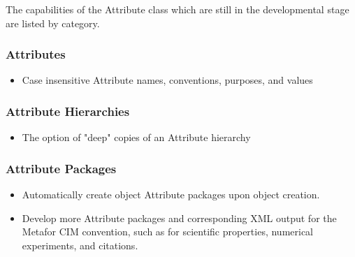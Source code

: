 %

The capabilities of the Attribute class which are still in the developmental stage are listed by category.
 
\subsubsection{Attributes}

\begin{itemize}
\item Case insensitive Attribute names, conventions, purposes, and values
\end{itemize}

\subsubsection{Attribute Hierarchies}

\begin{itemize}
\item The option of "deep" copies of an Attribute hierarchy
\end{itemize}

\subsubsection{Attribute Packages}

\begin{itemize}
\item Automatically create object Attribute packages upon object creation.
\item Develop more Attribute packages and corresponding XML output for the Metafor CIM convention, such as for scientific properties, numerical experiments, and citations.
\end{itemize}
